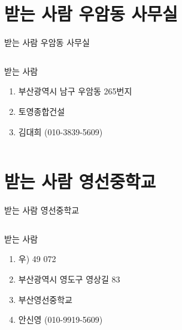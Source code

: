 \documentclass[aspectratio=1610,12pt,xcolor=pdftex,dvipsnames,table,handout]{beamer}
\begin{document}
		\section{받는 사람 우암동 사무실}
		\begin{frame}[c,plain]{받는 사람 우암동 사무실}

		\begin{columns}[t]
		\begin{column}{1.0\textwidth}

			\begin{block} {받는 사람}
			\begin{enumerate}
			\item [] 부산광역시 남구 우암동 265번지
			\item [] 토영종합건설
			\item [] 김대희 (010-3839-5609)
			\end{enumerate}
			\end{block}
		\end{column}
		\end{columns}

		\end{frame}


		\section{받는 사람 영선중학교}
		\begin{frame}[c,plain]{받는 사람 영선중학교}

		\begin{columns}[t]
		\begin{column}{1.0\textwidth}

			\begin{block} {받는 사람}
			\begin{enumerate}
			\item [] 우) 49 072
			\item [] 부산광역시 영도구 영상길 83
			\item [] 부산영선중학교 
			\item [] 안신영 (010-9919-5609)
			\end{enumerate}
			\end{block}
		\end{column}
		\end{columns}

		\end{frame}
\end{document}
